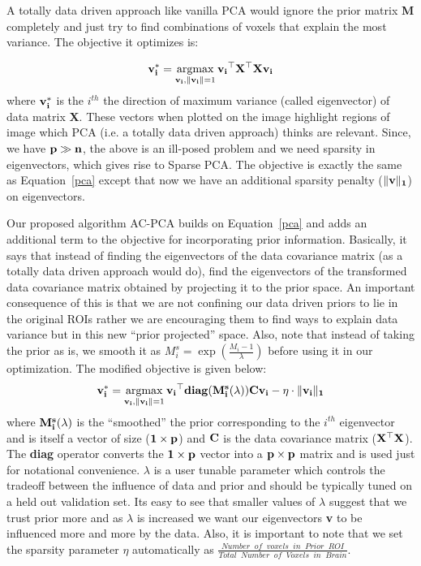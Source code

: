 \documentclass{llncs}
\newcommand{\argmax}{\operatornamewithlimits{argmax}}
\begin{document}
A totally data driven approach like vanilla PCA would ignore the prior matrix {\bf M} completely and just try to find combinations of voxels that explain the most variance. The objective it optimizes is:

\begin{equation}
{\bf v_i^*}= \argmax_{{\bf v_i},{\bf \|v_i\|}=1} {\bf v_i}^{\top}{\bf X^{\top}X}{\bf v_i}
\label{pca}
\end{equation}
where {$\bf v_i^*$} is the $i^{th}$ the direction of maximum variance (called eigenvector) of data matrix {\bf X}. These vectors when plotted on the image highlight regions of image which PCA (i.e. a totally data driven approach) thinks are relevant. Since, we have ${\bf p \gg n}$, the above is an ill-posed problem and we need sparsity in eigenvectors, which gives rise to Sparse PCA. The objective is exactly the same as Equation~\ref{pca} except that now we have an additional sparsity penalty ($\|\bf v \|_1$) on eigenvectors.


Our proposed algorithm AC-PCA builds on Equation~\ref{pca} and adds an additional term to the objective for incorporating prior information. Basically, it says that instead of finding the eigenvectors of the data covariance matrix (as a totally data driven approach would do), find the eigenvectors of the transformed data covariance matrix obtained by projecting it to the prior space. An important consequence of this is that we are not confining our data driven priors to lie in the original ROIs rather we are encouraging them to find ways to explain data variance but in this new ``prior projected'' space.  Also, note that instead of taking the prior as is, we smooth it as $M^s_i=\exp(\frac{M_i-1}{\lambda})$ before using it in our optimization. The modified objective is given below:
\begin{equation}
\label{ppca}
{\bf v_i^*}= \argmax_{{\bf v_i},{\bf \|v_i\|}=1} {\bf v_i}^{\top}{\bf diag(M^s_i(\lambda))}{\bf C}{\bf v_i} - \eta\cdot\|\bf v_i \|_1
\end{equation}
where ${\bf M^s_i(\lambda)}$ is  the ``smoothed'' the prior corresponding to the $i^{th}$ eigenvector and is itself a vector of size (${\bf 1\times p}$) and $\bf C$ is the data covariance matrix ($\bf X^{\top}X$). The {\bf diag} operator converts the ${\bf 1\times p}$ vector into a ${\bf p\times p}$ matrix and is used just for notational convenience.  $\lambda$ is a user tunable parameter which controls the tradeoff between the influence of data and prior and should be typically tuned on a held out validation set. Its easy to see that smaller values of $\lambda$ suggest that we trust prior more and as $\lambda$ is increased we want our eigenvectors {\bf v} to be influenced more and more by the data. Also, it is important to note that we set the sparsity parameter $\eta$ automatically as $\frac{Number\;\;of\;\;voxels\;\;in\;\;Prior\;\;ROI}{Total\;\;Number\;\;of\;\;Voxels\;\;in\;\;Brain}$. 
\end{document}
